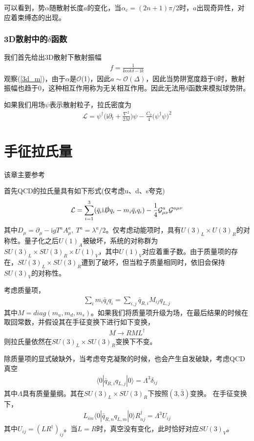 \documentclass[aps,tightenlines,16pt]{ctexart}
\numberwithin{equation}{section}
\newcommand{\mO}{\mathcal{O}}
\newcommand{\mL}{\mathcal{L}}
\begin{document}
可以看到，势$\alpha$随散射长度$a$的变化，当$\alpha_c=(2n+1)\pi/2$时，$a$出现奇异性，对应着束缚态的出现。

\subsubsection{3D散射中的$\delta$函数}

我们首先给出3D散射下散射振幅
\begin{align}
   f=\frac{1}{k\mbox{cot}\delta-\mbox{i}k}
\end{align}
观察(\ref{3d_m})，由于$\alpha$是$\mO$(1)，因此$a\sim\mO(\Delta)$，因此当势阱宽度趋于0时，散射振幅也趋于0，这种相互作用称为无关相互作用。因此无法用$\delta$函数来模拟球势阱。

如果我们用场$\psi$表示散射粒子，拉氏密度为
\begin{align}
   \mL = \psi^{\dagger}\Big(\mbox{i}\partial_t+\frac{\nabla^2}{2M}\Big)\psi-\frac{C_0}{4}\Big(\psi^{\dagger}\psi\Big)^2
\end{align}


\section{手征拉氏量}
该章主要参考\cite{scherer2011primer}

首先QCD的拉氏量具有如下形式(仅考虑u、d、s夸克)
\begin{align}
   \mL=\sum_{i=1}^{3}(\bar{q}_i \mbox{i} \slashed{D} q_i-m_i \bar{q}_i q_i)-\frac{1}{4}\mathcal{G}_{\mu \nu}^a \mathcal{G}^{a \mu \nu} 
\end{align}
其中$D_{\mu}=\partial_{\mu}-\mbox{i} g T^a A_{\mu}^a,\ T^a=\lambda^a/2$。仅考虑动能项时，具有$U(3)_L \times U(3)_R$的对称性。量子化之后$U(1)_A$被破坏，系统的对称群为$SU(3)_L \times SU(3)_R \times U(1)_V$，其中$U(1)_V$对应着重子数。由于质量项的存在，$SU(3)_L \times SU(3)_R$遭到了破坏，但当粒子质量相同时，依旧会保持$SU(3)_V$的对称性。

考虑质量项，
\begin{align}
   \sum_{i} m_i \bar{q}_i q_i = \sum_{i,j} \bar{q}_{R,i} M_{ij} q_{L,j}
\end{align}
其中$M=diag(m_u,m_d,m_s)$。如果我们将质量项升级为场，在最后结果的时候在取回常数，并假设其在手征变换下进行如下变换，
\begin{align}
   M \to RML^{\dagger}
\end{align}
则拉氏量依然在$SU(3)_L \times SU(3)_R$变换下不变。

除质量项的显式破缺外，当考虑夸克凝聚的时候，也会产生自发破缺，考虑QCD真空
\begin{align}
   \langle 0 | \bar{q}_{R,i} q_{L,j}| 0 \rangle =\Lambda ^3 \delta_{ij}
\end{align}
其中$\Lambda$具有质量量纲。其在$SU(3)_L \times SU(3)_R$下按照$(3,\bar{3})$变换。
在手征变换下，
\begin{align}
   L_{im}\langle 0 | \bar{q}_{R,n} q_{L,m}| 0 \rangle R^{\dagger}_{nj}=\Lambda ^3 U_{ij}
\end{align}
其中$U_{ij}=(LR^{\dagger})_{ij}$。当$L=R$时，真空没有变化，此时恰好对应$SU(3)_V$。
\end{document}
